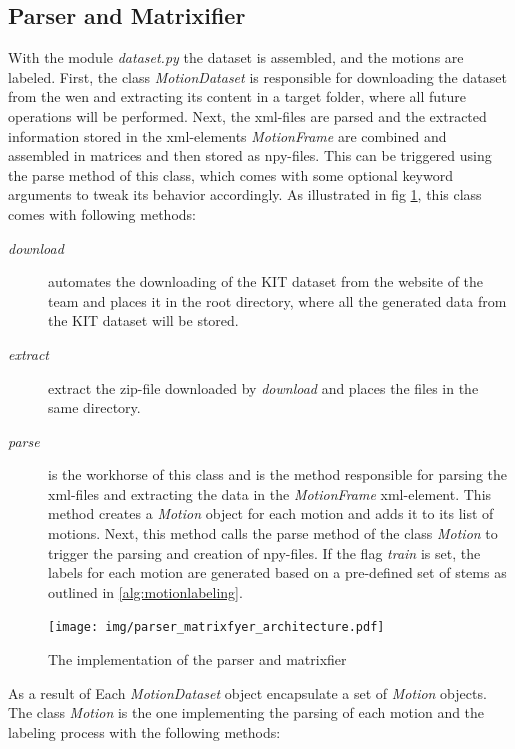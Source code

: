 		\subsection{Parser and Matrixifier}\label{subsec:parser_matrixifier}
			With the module \textit{dataset.py} the dataset is assembled, and the motions are labeled. First, the class \textit{MotionDataset} is responsible for downloading the dataset from the wen and extracting its content in a target folder, where all future operations will be performed. Next, the xml-files are parsed and the extracted information stored in the xml-elements \textit{MotionFrame} are combined and assembled in matrices and then stored as npy-files. This can be triggered using the parse method of this class, which comes with some optional keyword arguments to tweak its behavior accordingly. As illustrated in fig \ref{fig:parsermatrixifier}, this class comes with following methods:
			\begin{description}
				\item[\textit{download}] automates the downloading of the KIT dataset from the website of the team and places it in the root directory, where all the generated data from the KIT dataset will be stored.
				\item[\textit{extract}] extract the zip-file downloaded by \textit{download} and places the files in the same directory.
				\item[\textit{parse}] is the workhorse of this class and is the method responsible for parsing the xml-files and extracting the data in the \textit{MotionFrame} xml-element. This method creates a \textit{Motion} object for each motion and adds it to its list of motions. Next, this method calls the parse method of the class \textit{Motion} to trigger the parsing and creation of npy-files. If the flag \textit{train} is set, the labels for each motion are generated based on a pre-defined set of stems as outlined in \ref{alg:motionlabeling}. 
			\end{description}
			\begin{figure}[H]
				\centering
				\texttt{[image: img/parser\_matrixfyer\_architecture.pdf]}
				\caption{The implementation of the parser and matrixfier}
				\label{fig:parsermatrixifier}
			\end{figure}
			As a result of Each \textit{MotionDataset} object encapsulate a set of \textit{Motion} objects. The class \textit{Motion} is the one implementing the parsing of each motion and the labeling process with the following methods:
